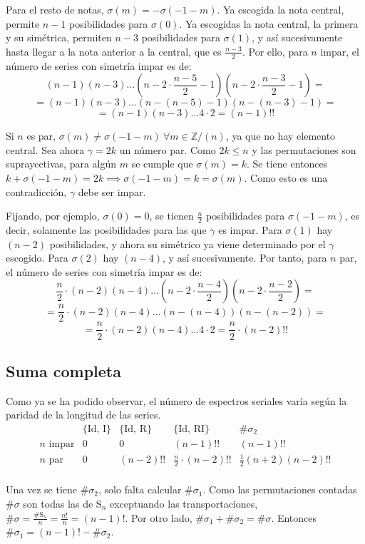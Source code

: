 		Para el resto de notas, $\sigma(m)=-\sigma(-1-m)$. Ya escogida la nota central, permite $n-1$ posibilidades para $\sigma(0)$. Ya escogidas la nota central, la primera y su simétrica, permiten $n-3$ posibilidades para $\sigma(1)$, y así sucesivamente hasta llegar a la nota anterior a la central, que es $\frac{n-3}{2}$. Por ello, para $n$ impar, el número de series con simetría impar es de:	
		\[(n-1)(n-3)\ldots(n-2\cdot\frac{n-5}{2}-1)(n-2\cdot\frac{n-3}{2}-1)=\]
		\[=(n-1)(n-3)\ldots(n-(n-5)-1)(n-(n-3)-1)=\]
		\[=(n-1)(n-3)\ldots4\cdot2=(n-1)!!\]
		
		Si $n$ es par, $\sigma(m)\neq\sigma(-1-m)\ \forall m\in \mathbb{Z} / (n)$, ya que no hay elemento central. Sea ahora $\gamma=2k$ un número par. Como $2k\leq n$ y las permutaciones son suprayectivas, para algún $m$ se cumple que $\sigma(m)=k$. Se tiene entonces $k+\sigma(-1-m)=2k\implies\sigma(-1-m)=k=\sigma(m)$. Como esto es una contradicción, $\gamma$ debe ser impar.
		
		Fijando, por ejemplo, $\sigma(0)=0$, se tienen $\frac{n}{2}$ posibilidades para $\sigma(-1-m)$, es decir, solamente las posibilidades para las que $\gamma$ es impar. Para $\sigma(1)$ hay $(n-2)$ posibilidades, y ahora su simétrico ya viene determinado por el $\gamma$ escogido. Para $\sigma(2)$ hay $(n-4)$, y así sucesivamente. \cite{reiner} Por tanto, para $n$ par, el número de series con simetría impar es de: 
		\[\frac{n}{2}\cdot(n-2)(n-4)\ldots(n-2\cdot\frac{n-4}{2})(n-2\cdot\frac{n-2}{2})=\]
		\[=\frac{n}{2}\cdot(n-2)(n-4)\ldots(n-(n-4))(n-(n-2))=\]
		\[=\frac{n}{2}\cdot(n-2)(n-4)\ldots4\cdot2=\frac{n}{2}\cdot(n-2)!!\]
			\newpage
	\subsection*{Suma completa}
		Como ya se ha podido observar, el número de espectros seriales varía según la paridad de la longitud de las series.		
		\def\arraystretch{1.5}
		\[\begin{array}{c|c|c|c|c}
		&\{\text{Id, I}\}&\{\text{Id, R}\}&\{\text{Id, RI}\}&\#\sigma_2\\\hline
		n\text{ impar}&0&0&(n-1)!!&(n-1)!!\\\hline
		n\text{ par}&0&(n-2)!!&\frac{n}{2}\cdot(n-2)!!&\frac{1}{2}(n+2)(n-2)!!\\
		\end{array}\]
		\def\arraystretch{1}
		
		Una vez se tiene $\#\sigma_2$, solo falta calcular $\#\sigma_1$. Como las permutaciones contadas $\#\sigma$ son todas las de $\text{S}_n$ exceptuando las transportaciones, $\#\sigma=\frac{\#\text{S}_n}{n}=\frac{n!}{n}=(n-1)!$. Por otro lado, $\#\sigma_1 +\#\sigma_2=\#\sigma$. Entonces $\#\sigma_1=(n-1)!-\#\sigma_2$.
		
